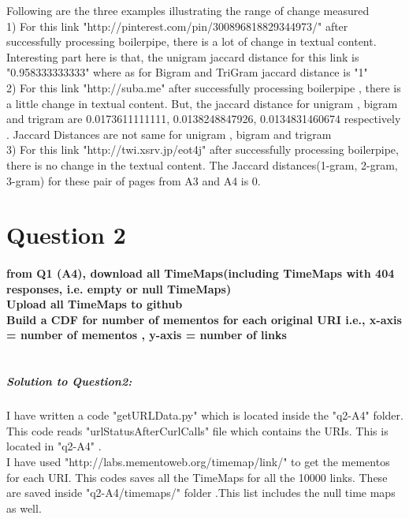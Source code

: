 \documentclass[12pt]{Report}
\begin{document}
Following are the three examples illustrating the range of change measured \\

1) For this link "http://pinterest.com/pin/300896818829344973/" after successfully processing boilerpipe, there is a lot of change in textual content. Interesting part here is that, the unigram jaccard distance  for this link is "0.958333333333" where as for Bigram and TriGram jaccard distance is "1"\\


2) For this link "http://suba.me" after successfully processing boilerpipe , there is a little change in textual content. But, the jaccard distance for unigram , bigram and trigram are 0.0173611111111, 0.0138248847926, 0.0134831460674 respectively . Jaccard Distances are not same for unigram , bigram and trigram \\


3) For this link "http://twi.xsrv.jp/eot4j" after successfully processing boilerpipe, there is no change in the textual content. The Jaccard distances(1-gram, 2-gram, 3-gram) for these pair of pages from A3  and A4 is 0.\\
 




\section{Question 2\\}

\paragraph{from Q1 (A4), download all TimeMaps(including TimeMaps with 404 responses, i.e. empty or null TimeMaps) \\ Upload all TimeMaps to github\\ Build a CDF for number of mementos for each original URI i.e., x-axis = number of mementos , y-axis = number of links \\\\ }

\subparagraph{Solution to Question2: \\}
I have written a code "getURLData.py" which is located inside the "q2-A4" folder. This code reads "urlStatusAfterCurlCalls" file which contains the URIs. This is located in "q2-A4" .\\ I have used  "http://labs.mementoweb.org/timemap/link/" to get the mementos for each URI. This codes saves all the TimeMaps for all the 10000 links. These are saved inside "q2-A4/timemaps/" folder .This list includes the null time maps as well.\\
\end{document}
